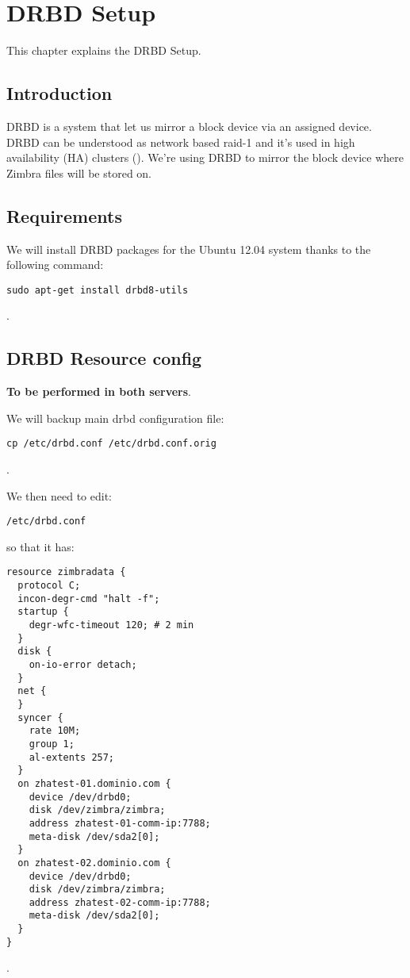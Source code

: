 

\chapter{DRBD Setup}
This chapter explains the DRBD Setup.

\section {Introduction}
DRBD is a system that let us mirror a block device via an assigned device. DRBD can be understood as network based raid-1 and it's used in high availability (HA) clusters (\cite{LinbitDRBDWhatIs}).
We're using DRBD to mirror the block device where Zimbra files will be stored on.

\section {Requirements}
We will install DRBD packages for the Ubuntu 12.04 system thanks to the following command:
\begin{verbatim}
sudo apt-get install drbd8-utils
\end{verbatim}
.



\section {DRBD Resource config}
\textbf{To be performed in both servers}.

We will backup main drbd configuration file:
\begin{verbatim}
cp /etc/drbd.conf /etc/drbd.conf.orig
\end{verbatim}
.

We then need to edit:
\begin{verbatim}
/etc/drbd.conf
\end{verbatim}
so that it has:
\begin{verbatim}
resource zimbradata {
  protocol C;
  incon-degr-cmd "halt -f";
  startup {
    degr-wfc-timeout 120; # 2 min
  }
  disk {
    on-io-error detach;
  }
  net {
  }
  syncer {
    rate 10M;
    group 1;
    al-extents 257;
  }
  on zhatest-01.dominio.com {
    device /dev/drbd0;
    disk /dev/zimbra/zimbra;
    address zhatest-01-comm-ip:7788;
    meta-disk /dev/sda2[0];
  }
  on zhatest-02.dominio.com {
    device /dev/drbd0;
    disk /dev/zimbra/zimbra;
    address zhatest-02-comm-ip:7788;
    meta-disk /dev/sda2[0];
  }
}
\end{verbatim}
.


